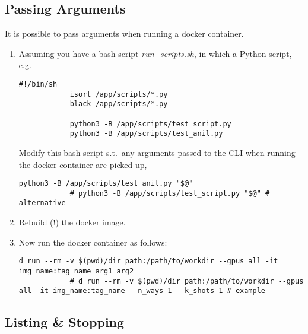 \documentclass[12pt, a4paper]{scrbook}
\numberwithin{equation}{section}
\theoremstyle{definition}
\theoremstyle{definition}
\begin{document}
	\subsection{Passing Arguments}
	
	It is possible to pass arguments when running a docker container. 
	
	\begin{enumerate}
		\item Assuming you have a bash script \textit{run\_scripts.sh}, in which a Python script, e.g.
		
		\begin{lstlisting}[style=mystylebash, label=alg:docker_run__pass_arguments, xleftmargin=\parindent]
			#!/bin/sh
			isort /app/scripts/*.py
			black /app/scripts/*.py
			
			python3 -B /app/scripts/test_script.py
			python3 -B /app/scripts/test_anil.py
		\end{lstlisting}
		
		Modify this bash script s.t.~any arguments passed to the CLI when running the docker container are picked up,
		
		\begin{lstlisting}[style=mystylebash, label=alg:docker_run__pass_arguments_mod, xleftmargin=\parindent]
			python3 -B /app/scripts/test_anil.py "$@"
			# python3 -B /app/scripts/test_script.py "$@" # alternative
		\end{lstlisting}
		
		\item Rebuild (!) the docker image.
		
		\item Now run the docker container as follows:
		
		\begin{lstlisting}[style=mystylebash, label=alg:docker_run__pass_arguments_container, xleftmargin=\parindent]
			d run --rm -v $(pwd)/dir_path:/path/to/workdir --gpus all -it img_name:tag_name arg1 arg2
			# d run --rm -v $(pwd)/dir_path:/path/to/workdir --gpus all -it img_name:tag_name --n_ways 1 --k_shots 1 # example
		\end{lstlisting}
		
	\end{enumerate}
	
	\subsection{Listing \& Stopping}
	
\end{document}
